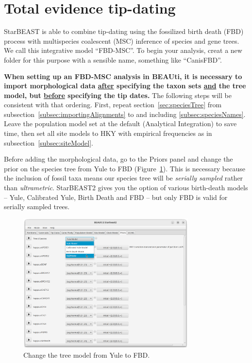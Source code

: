 \documentclass[12pt]{article}
\begin{document}
\section{Total evidence tip-dating}
\label{sec:FBD}

StarBEAST is able to combine
tip-dating using the fossilized birth death (FBD) process with multispecies
coalescent (MSC) inference of species and gene trees. We call this integrative
model ``FBD-MSC''. To begin your analysis, creat a new folder for this
purpose with a sensible name, something like ``CanisFBD''.

\textbf{When setting up an FBD-MSC analysis in BEAUti, it is necessary to
import morphological data \ul{after} specifying the taxon sets \ul{and} the
tree model, but \ul{before} specifying the tip dates.} The following steps
will be consistent with that ordering. First, repeat
section~\ref{sec:speciesTree} from subsection~\ref{subsec:importingAlignments}
to and including \ref{subsec:speciesNames}. Leave the population model set at
the default (Analytical Integration) to save time, then set
all site models to HKY with empirical frequencies as in
subsection~\ref{subsec:siteModel}.

Before adding the morphological data, go to the Priors panel and change
the prior on the species tree from Yule to FBD
(Figure~\ref{fig:changeTreePrior}). This is necessary because the inclusion of
fossil taxa means our species tree will be \textit{serially sampled} rather
than \textit{ultrametric}. StarBEAST2 gives you the option of various
birth-death models -- Yule, Calibrated Yule, Birth Death and FBD -- but only
FBD is valid for serially sampled trees.

\begin{figure}[htb!]
\centering
\includegraphics[width=0.8\textwidth]{figures/changeTreePrior.png}
\caption
{Change the tree model from Yule to FBD.}
\label{fig:changeTreePrior}
\end{figure}
\end{document}
